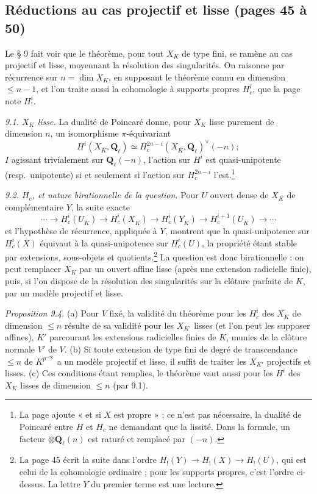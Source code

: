 \documentclass[11pt,a4paper]{article}
\begin{document}
\subsection*{Réductions au cas projectif et lisse (pages 45 à 50)}

Le § 9 fait voir que le théorème, pour tout $X_K$ de type fini, se ramène au cas
projectif et lisse, moyennant la résolution des singularités. On raisonne par
récurrence sur $n = \dim X_K$, en supposant le théorème connu en dimension
$\leq n - 1$, et l'on traite aussi la cohomologie à supports propres
$H^i_c$, que la page note $H^i_!$.

\emph{9.1. $X_K$ lisse.} La dualité de Poincaré donne, pour $X_K$ lisse purement
de dimension $n$, un isomorphisme $\pi$-équivariant
\[
  H^i(X_{\overline K}, \mathbf{Q}_\ell) \simeq
  H^{2n-i}_c(X_{\overline K}, \mathbf{Q}_\ell)^\vee(-n) ;
\]
$I$ agissant trivialement sur $\mathbf{Q}_\ell(-n)$, l'action sur $H^i$ est
quasi-unipotente (resp.\ unipotente) si et seulement si l'action sur
$H^{2n-i}_c$ l'est.\footnote{La page ajoute « et si $X$ est propre » ; ce n'est
pas nécessaire, la dualité de Poincaré entre $H$ et $H_c$ ne demandant que la
lissité. Dans la formule, un facteur $\otimes \mathbf{Q}_\ell(n)$ est raturé et
remplacé par $(-n)$.}

\emph{9.2. $H_c$, et nature birationnelle de la question.} Pour $U$ ouvert dense
de $X_K$ de complémentaire $Y$, la suite exacte
\[
  \cdots \to H^i_c(U_{\overline K}) \to H^i_c(X_{\overline K}) \to
  H^i_c(Y_{\overline K}) \to H^{i+1}_c(U_{\overline K}) \to \cdots
\]
et l'hypothèse de récurrence, appliquée à $Y$, montrent que la quasi-unipotence
sur $H^i_c(X)$ équivaut à la quasi-unipotence sur $H^i_c(U)$, la propriété étant
stable par extensions, sous-objets et quotients.\footnote{La page 45 écrit la
suite dans l'ordre $H_!(Y) \to H_!(X) \to H_!(U)$, qui est celui de la
cohomologie ordinaire ; pour les supports propres, c'est l'ordre ci-dessus. La
lettre $Y$ du premier terme est une lecture.} La question est donc
birationnelle : on peut remplacer $X_K$ par un ouvert affine lisse (après une
extension radicielle finie), puis, si l'on dispose de la résolution des
singularités sur la clôture parfaite de $K$, par un modèle projectif et lisse.

\emph{Proposition 9.4.} (a) Pour $V$ fixé, la validité du théorème pour les
$H^i_c$ des $X_K$ de dimension $\leq n$ résulte de sa validité pour les $X_{K'}$
lisses (et l'on peut les supposer affines), $K'$ parcourant les extensions
radicielles finies de $K$, munies de la clôture normale $V'$ de $V$. (b) Si
toute extension de type fini de degré de transcendance $\leq n$ de
$K^{p^{-\infty}}$ a un modèle projectif et lisse, il suffit de traiter les
$X_{K'}$ projectifs et lisses. (c) Ces conditions étant remplies, le théorème
vaut aussi pour les $H^i$ des $X_K$ lisses de dimension $\leq n$ (par 9.1).
\end{document}
